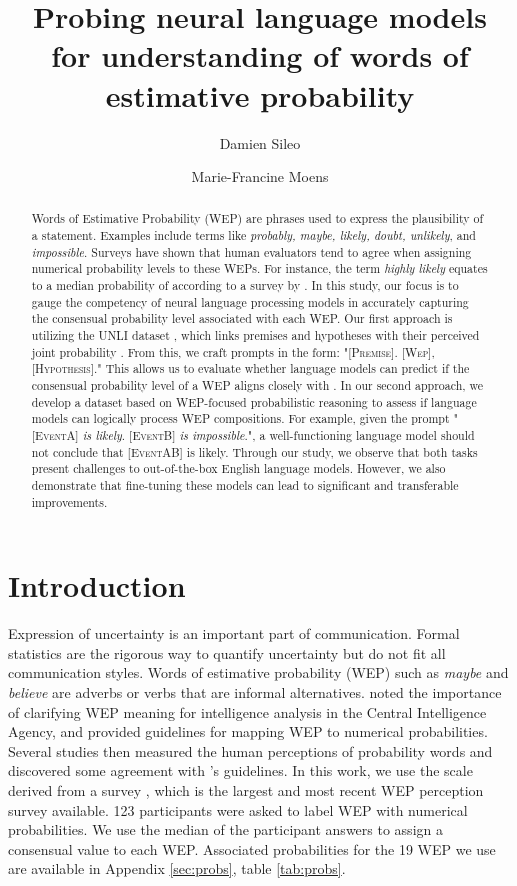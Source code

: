 \documentclass[11pt]{article}
\title{Probing neural language models\\ for understanding of words of estimative probability }
\author[1]{Damien Sileo}
\author[2]{Marie-Francine Moens}
\affil[1]{Univ. Lille, Inria, CNRS, Centrale Lille, UMR 9189 - CRIStAL, F-59000 Lille, France}
\affil[2]{Department of Computer Science, KU Leuven, Belgium} \vspace{-2ex}
\affil[ ]{\url{damien.sileo@inria.fr}}
\begin{document}
\maketitle
\begin{abstract}


Words of Estimative Probability (WEP) are phrases used to express the plausibility of a statement. Examples include terms like \textit{probably, maybe, likely, doubt, unlikely}, and \textit{impossible}. Surveys have shown that human evaluators tend to agree when assigning numerical probability levels to these WEPs. For instance, the term \textit{highly likely} equates to a median probability of  according to a survey by \citet{fagen-ulmschneider}.
In this study, our focus is to gauge the competency of neural language processing models in accurately capturing the consensual probability level associated with each WEP. Our first approach is utilizing the UNLI dataset \cite{chen-etal-2020-uncertain}, which links premises and hypotheses with their perceived joint probability . From this, we craft prompts in the form: "[\textsc{Premise}]. [\textsc{Wep}], [\textsc{Hypothesis}]." This allows us to evaluate whether language models can predict if the consensual probability level of a WEP aligns closely with .
In our second approach, we develop a dataset based on WEP-focused probabilistic reasoning to assess if language models can logically process WEP compositions. For example, given the prompt "[\textsc{EventA}] \textit{is likely}. [\textsc{EventB}] \textit{is impossible}.", a well-functioning language model should not conclude that [\textsc{EventAB}] is likely.
Through our study, we observe that both tasks present challenges to out-of-the-box English language models. However, we also demonstrate that fine-tuning these models can lead to significant and transferable improvements.



\end{abstract}

\section{Introduction}

Expression of uncertainty is an important part of communication.  Formal statistics are the rigorous way to quantify uncertainty but do not fit all communication styles. Words of estimative probability (WEP) such as \textit{maybe} and \textit{believe} are adverbs or verbs that are informal alternatives. \citet{kent1964words} noted the importance of clarifying WEP meaning for intelligence analysis in the Central Intelligence Agency, and provided guidelines for mapping WEP to numerical probabilities. Several studies then measured the human perceptions of probability words and discovered some agreement with \citet{kent1964words}'s guidelines. In this work, we use the scale derived from a survey \cite{fagen-ulmschneider}, which is the largest and most recent WEP perception survey available. 123 participants were asked to label WEP with numerical probabilities. We use the median of the participant answers to assign a consensual value to each WEP. Associated probabilities for the 19 WEP we use are available in Appendix \ref{sec:probs}, table \ref{tab:probs}.
\end{document}
